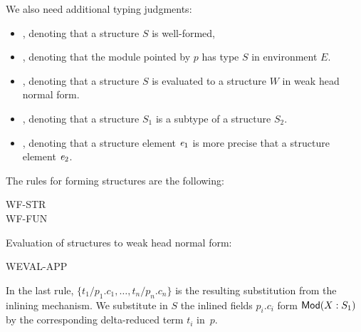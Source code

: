 We also need additional typing judgments: 
\begin{itemize}
\item {}, denoting that a structure $S$ is well-formed, 

\item {}, denoting that the module pointed by $p$ has type $S$ in
environment $E$.

\item {}, denoting that a structure $S$ is evaluated to 
a structure $W$ in weak head normal form.

\item {}, denoting that a structure $S_1$ is a subtype of a
structure $S_2$.

\item {}, denoting that a structure element
  ${\it e}_1$ is more precise that a structure element ${\it e}_2$.
\end{itemize}
The rules for forming structures are the following:
\begin{description}
\item[WF-STR]
\item[WF-FUN]
\end{description}
Evaluation of structures to weak head normal form:
\begin{description}
\item[WEVAL-APP]
\end{description}
In the last rule, $\{t_1/p_1.c_1,\ldots,t_n/p_n.c_n\}$ is the resulting
 substitution from the inlining mechanism. We substitute in $S$ the
 inlined fields $p_i.c_i$ form ${\sf Mod}({X}:{S_1})$ by the corresponding delta-reduced term $t_i$ in~$p$.
